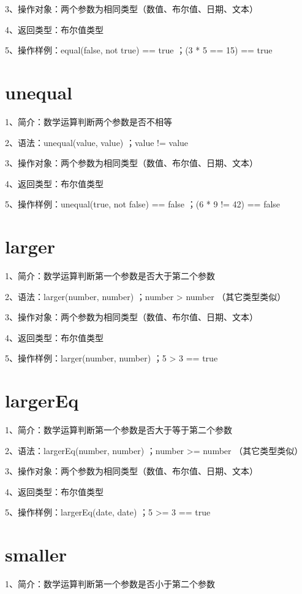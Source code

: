 3、操作对象：两个参数为相同类型（数值、布尔值、日期、文本）

4、返回类型：布尔值类型

5、操作样例：equal(false, not true) == true ；(3 * 5 == 15) == true

\section{unequal}

1、简介：数学运算判断两个参数是否不相等

2、语法：unequal(value, value) ；value != value

3、操作对象：两个参数为相同类型（数值、布尔值、日期、文本）

4、返回类型：布尔值类型

5、操作样例：unequal(true, not false) == false ；(6 * 9 != 42) == false

\section{larger}

1、简介：数学运算判断第一个参数是否大于第二个参数

2、语法：larger(number, number) ；number > number （其它类型类似）

3、操作对象：两个参数为相同类型（数值、布尔值、日期、文本）

4、返回类型：布尔值类型

5、操作样例：larger(number, number) ；5 > 3 == true

\section{largerEq}

1、简介：数学运算判断第一个参数是否大于等于第二个参数

2、语法：largerEq(number, number) ；number >= number （其它类型类似）

3、操作对象：两个参数为相同类型（数值、布尔值、日期、文本）

4、返回类型：布尔值类型

5、操作样例：largerEq(date, date) ；5 >= 3 == true

\section{smaller}

1、简介：数学运算判断第一个参数是否小于第二个参数

